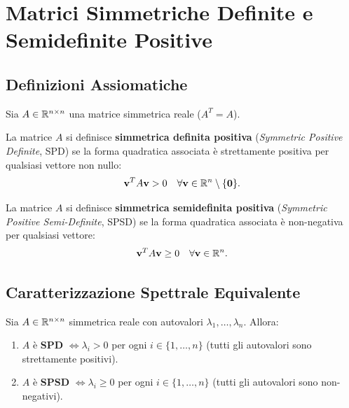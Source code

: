 \FloatBarrier
\section{Matrici Simmetriche Definite e Semidefinite Positive}
\label{sec:matrici-spd-spsd}

\subsection{Definizioni Assiomatiche}

Sia $A \in \mathbb{R}^{n \times n}$ una matrice simmetrica reale ($A^T = A$).

\begin{definition}
La matrice $A$ si definisce \textbf{simmetrica definita positiva} (\textit{Symmetric Positive Definite}, SPD) se la forma quadratica associata \`e strettamente positiva per qualsiasi vettore non nullo:
\begin{equation}
    \mathbf{v}^T A \mathbf{v} > 0 \quad \forall \mathbf{v} \in \mathbb{R}^n \setminus \{\mathbf{0}\}.
\end{equation}
\end{definition}

\begin{definition}
La matrice $A$ si definisce \textbf{simmetrica semidefinita positiva} (\textit{Symmetric Positive Semi-Definite}, SPSD) se la forma quadratica associata \`e non-negativa per qualsiasi vettore:
\begin{equation}
    \mathbf{v}^T A \mathbf{v} \ge 0 \quad \forall \mathbf{v} \in \mathbb{R}^n.
\end{equation}
\end{definition}

\subsection{Caratterizzazione Spettrale Equivalente}

\begin{theorem}
\label{thm:criterio-spettrale-spd}
Sia $A \in \mathbb{R}^{n \times n}$ simmetrica reale con autovalori $\lambda_1, \dots, \lambda_n$. Allora:
\begin{enumerate}
    \item $A$ \`e \textbf{SPD} $\iff \lambda_i > 0$ per ogni $i \in \{1, \dots, n\}$ (tutti gli autovalori sono strettamente positivi).
    \item $A$ \`e \textbf{SPSD} $\iff \lambda_i \ge 0$ per ogni $i \in \{1, \dots, n\}$ (tutti gli autovalori sono non-negativi).
\end{enumerate}
\end{theorem}

